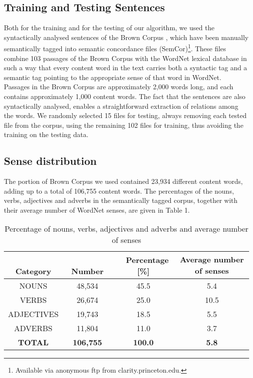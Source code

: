 \subsection{Training and Testing Sentences}
Both for the training and for the testing of our algorithm, we used the syntactically analysed sentences of the Brown Corpus \cite{Marcus93}, which have been manually semantically tagged \cite{Miller93} into semantic concordance files (SemCor)\footnote{
Available via anonymous ftp from clarity.princeton.edu.
}. These files combine 103 passages of the Brown Corpus with the WordNet lexical database in such a way that every content word in the text carries both a syntactic tag and a semantic tag pointing to the appropriate sense of that word in WordNet. Passages in the Brown Corpus are approximately 2,000 words long, and each contains approximately 1,000 content words. The fact that the sentences are also syntactically analysed, enables a straightforward extraction of relations among the words. We randomly selected 15 files for testing, always removing each tested file from the corpus, using the remaining 102 files for training, thus avoiding the training on the testing data.

\subsection{Sense distribution}
The portion of Brown Corpus we used contained 23,934 different content words, adding up to a total of 106,755 content words. The percentages of the nouns, verbs, adjectives and adverbs in the semantically tagged corpus, together with their average number of WordNet senses, are given in Table 1.


\begin{table}[t]
  \leavevmode
    \caption{Percentage of nouns, verbs, adjectives and adverbs and average number of senses}
    \label{tab:1}
  \begin{center}
\begin{tabular}[c]{|c|c|c|c|}\hline
\multicolumn{1}{|p{3cm}|}{\bf 　　Category} &
\multicolumn{1}{|p{3cm}|}{\bf 　　 Number} &
\multicolumn{1}{|p{3cm}|}{\bf 　Percentage [\%]}&
\multicolumn{1}{|p{3cm}|}{\bf Average number of senses}\\\hline
NOUNS & 48,534 & 45.5 & 5.4 \\\hline
VERBS & 26,674 & 25.0 & 10.5 \\\hline
ADJECTIVES & 19,743 & 18.5 & 5.5 \\\hline
ADVERBS & 11,804 & 11.0 & 3.7 \\\hline
{\bf TOTAL} & {\bf 106,755} & {\bf 100.0} & {\bf 5.8}\\\hline
\end{tabular}
\end{center}
\end{table}

